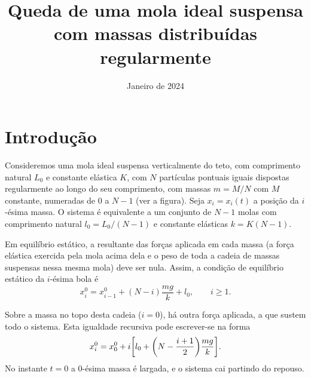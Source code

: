 \documentclass{article}
\title{Queda de uma mola ideal suspensa com massas distribuídas regularmente}
\author{}
\date{Janeiro de 2024}
\begin{document}
\maketitle
\section{Introdução}
\begin{minipage}[t]{0.80\linewidth}
  Consideremos uma mola ideal suspensa verticalmente do teto, com comprimento
  natural $L_0$ e constante elástica $K$, com $N$ partículas pontuais iguais
  dispostas regularmente ao longo do seu comprimento, com massas $m=M/N$ com $M$
  constante, numeradas de 0 a $N-1$ (ver a figura). Seja $x_i=x_i(t)$ a posição
  da $i$-ésima massa. O sistema é equivalente a um conjunto de $N-1$ molas com
  comprimento natural $l_0=L_0/(N-1)$ e constante elásticas $k=K(N-1)$.

  Em equilíbrio estático, a resultante das forças aplicada em cada massa (a
  força elástica exercida pela mola acima dela e o peso de toda a cadeia de
  massas suspensas nessa mesma mola) deve ser nula. Assim, a condição de
  equilíbrio estático da $i$-ésima bola é
  \begin{equation}
    x^0_i = x^0_{i-1} + (N-i)\frac{mg}{k} + l_0, \qquad i\geq1.
  \end{equation}
\end{minipage}\hfill
{}

\vspace{0.75em}
\noindent
Sobre a massa no topo desta cadeia ($i=0$), há outra força aplicada, a que
sustem todo o sistema. Esta igualdade recursiva pode escrever-se na forma
\begin{equation}
  x^0_i = x^0_0 + i\qty[l_0 + \qty(N-\frac{i+1}{2})\frac{mg}{k}].
\end{equation}
No instante $t=0$ a 0-ésima massa é largada, e o sistema cai partindo do
repouso.
\end{document}
